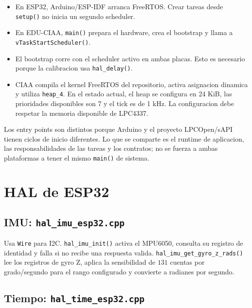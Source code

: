 \documentclass[11pt,a4paper]{article}
\begin{document}
\begin{itemize}
  \item En ESP32, Arduino/ESP-IDF arranca FreeRTOS. Crear tareas desde
        \texttt{setup()} no inicia un segundo scheduler.
  \item En EDU-CIAA, \texttt{main()} prepara el hardware, crea el bootstrap y
        llama a \texttt{vTaskStartScheduler()}.
  \item El bootstrap corre con el scheduler activo en ambas placas. Esto es
        necesario porque la calibracion usa \texttt{hal\_delay()}.
  \item CIAA compila el kernel FreeRTOS del repositorio, activa asignacion
        dinamica y utiliza \texttt{heap\_4}. En el estado actual, el heap se
        configura en 24 KiB, las prioridades disponibles son 7 y el tick es de
        1 kHz. La configuracion debe respetar la memoria disponible de LPC4337.
\end{itemize}

Los entry points son distintos porque Arduino y el proyecto LPCOpen/sAPI tienen
ciclos de inicio diferentes. Lo que se comparte es el runtime de aplicacion,
las responsabilidades de las tareas y los contratos; no se fuerza a ambas
plataformas a tener el mismo \texttt{main()} de sistema.

\section{HAL de ESP32}

\subsection{IMU: \texttt{hal\_imu\_esp32.cpp}}

Usa \texttt{Wire} para I2C. \texttt{hal\_imu\_init()} activa el MPU6050,
consulta su registro de identidad y falla si no recibe una respuesta valida.
\texttt{hal\_imu\_get\_gyro\_z\_rads()} lee los registros de gyro Z, aplica
la sensibilidad de $131$ cuentas por grado/segundo para el rango configurado y
convierte a radianes por segundo.

\subsection{Tiempo: \texttt{hal\_time\_esp32.cpp}}
\end{document}
